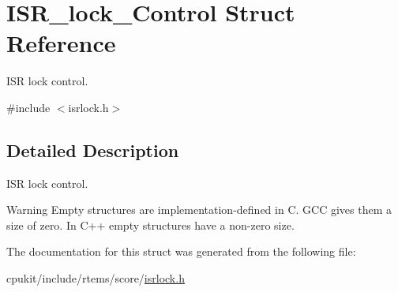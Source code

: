 \hypertarget{structISR__lock__Control}{}\section{I\+S\+R\+\_\+lock\+\_\+\+Control Struct Reference}
\label{structISR__lock__Control}


I\+SR lock control.  




{\ttfamily \#include $<$isrlock.\+h$>$}



\subsection{Detailed Description}
I\+SR lock control. 

\begin{DoxyWarning}{Warning}
Empty structures are implementation-\/defined in C. G\+CC gives them a size of zero. In C++ empty structures have a non-\/zero size. 
\end{DoxyWarning}


The documentation for this struct was generated from the following file\+:\begin{DoxyCompactItemize}
\item 
cpukit/include/rtems/score/\mbox{\hyperlink{isrlock_8h}{isrlock.\+h}}\end{DoxyCompactItemize}
